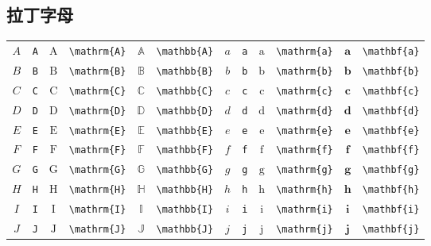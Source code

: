 \subsection{拉丁字母}
%
\begin{table}[th]
	\centering
	\renewcommand\arraystretch{0.99}
	\begin{tabular}{ c@{ }l c@{ }l c@{ }l c@{ }l c@{ }l c@{ }l}
		\hline
		$A$ & \verb|A| & $\mathrm{A}$ & \verb|\mathrm{A}| & $\mathbb{A}$ & \verb|\mathbb{A}| & $a$ & \verb|a| & $\mathrm{a}$ & \verb|\mathrm{a}| & $\mathbf{a}$ & \verb|\mathbf{a}| \\
		$B$ & \verb|B| & $\mathrm{B}$ & \verb|\mathrm{B}| & $\mathbb{B}$ & \verb|\mathbb{B}| & $b$ & \verb|b| & $\mathrm{b}$ & \verb|\mathrm{b}| & $\mathbf{b}$ & \verb|\mathbf{b}| \\
		$C$ & \verb|C| & $\mathrm{C}$ & \verb|\mathrm{C}| & $\mathbb{C}$ & \verb|\mathbb{C}| & $c$ & \verb|c| & $\mathrm{c}$ & \verb|\mathrm{c}| & $\mathbf{c}$ & \verb|\mathbf{c}| \\
		$D$ & \verb|D| & $\mathrm{D}$ & \verb|\mathrm{D}| & $\mathbb{D}$ & \verb|\mathbb{D}| & $d$ & \verb|d| & $\mathrm{d}$ & \verb|\mathrm{d}| & $\mathbf{d}$ & \verb|\mathbf{d}| \\
		$E$ & \verb|E| & $\mathrm{E}$ & \verb|\mathrm{E}| & $\mathbb{E}$ & \verb|\mathbb{E}| & $e$ & \verb|e| & $\mathrm{e}$ & \verb|\mathrm{e}| & $\mathbf{e}$ & \verb|\mathbf{e}| \\
		$F$ & \verb|F| & $\mathrm{F}$ & \verb|\mathrm{F}| & $\mathbb{F}$ & \verb|\mathbb{F}| & $f$ & \verb|f| & $\mathrm{f}$ & \verb|\mathrm{f}| & $\mathbf{f}$ & \verb|\mathbf{f}| \\
		$G$ & \verb|G| & $\mathrm{G}$ & \verb|\mathrm{G}| & $\mathbb{G}$ & \verb|\mathbb{G}| & $g$ & \verb|g| & $\mathrm{g}$ & \verb|\mathrm{g}| & $\mathbf{g}$ & \verb|\mathbf{g}| \\
		$H$ & \verb|H| & $\mathrm{H}$ & \verb|\mathrm{H}| & $\mathbb{H}$ & \verb|\mathbb{H}| & $h$ & \verb|h| & $\mathrm{h}$ & \verb|\mathrm{h}| & $\mathbf{h}$ & \verb|\mathbf{h}| \\
		$I$ & \verb|I| & $\mathrm{I}$ & \verb|\mathrm{I}| & $\mathbb{I}$ & \verb|\mathbb{I}| & $i$ & \verb|i| & $\mathrm{i}$ & \verb|\mathrm{i}| & $\mathbf{i}$ & \verb|\mathbf{i}| \\
		$J$ & \verb|J| & $\mathrm{J}$ & \verb|\mathrm{J}| & $\mathbb{J}$ & \verb|\mathbb{J}| & $j$ & \verb|j| & $\mathrm{j}$ & \verb|\mathrm{j}| & $\mathbf{j}$ & \verb|\mathbf{j}| \\

\end{tabular}
\end{table}
